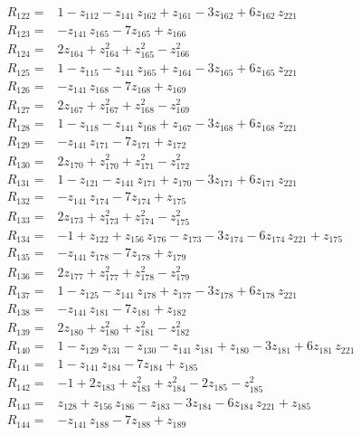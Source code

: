 \begin{align*}
R_{122}={}& 1 - z_{112} - z_{141}\,z_{162} + z_{161} - 3z_{162} + 6z_{162}\,z_{221} \\[2pt]
R_{123}={}& -z_{141}\,z_{165} - 7z_{165} + z_{166} \\[2pt]
R_{124}={}& 2z_{164} + z_{164}^{2} + z_{165}^{2} - z_{166}^{2} \\[2pt]
R_{125}={}& 1 - z_{115} - z_{141}\,z_{165} + z_{164} - 3z_{165} + 6z_{165}\,z_{221} \\[2pt]
R_{126}={}& -z_{141}\,z_{168} - 7z_{168} + z_{169} \\[2pt]
R_{127}={}& 2z_{167} + z_{167}^{2} + z_{168}^{2} - z_{169}^{2} \\[2pt]
R_{128}={}& 1 - z_{118} - z_{141}\,z_{168} + z_{167} - 3z_{168} + 6z_{168}\,z_{221} \\[2pt]
R_{129}={}& -z_{141}\,z_{171} - 7z_{171} + z_{172} \\[2pt]
R_{130}={}& 2z_{170} + z_{170}^{2} + z_{171}^{2} - z_{172}^{2} \\[2pt]
R_{131}={}& 1 - z_{121} - z_{141}\,z_{171} + z_{170} - 3z_{171} + 6z_{171}\,z_{221} \\[2pt]
R_{132}={}& -z_{141}\,z_{174} - 7z_{174} + z_{175} \\[2pt]
R_{133}={}& 2z_{173} + z_{173}^{2} + z_{174}^{2} - z_{175}^{2} \\[2pt]
R_{134}={}& -1 + z_{122} + z_{156}\,z_{176} - z_{173} - 3z_{174} - 6z_{174}\,z_{221} + z_{175} \\[2pt]
R_{135}={}& -z_{141}\,z_{178} - 7z_{178} + z_{179} \\[2pt]
R_{136}={}& 2z_{177} + z_{177}^{2} + z_{178}^{2} - z_{179}^{2} \\[2pt]
R_{137}={}& 1 - z_{125} - z_{141}\,z_{178} + z_{177} - 3z_{178} + 6z_{178}\,z_{221} \\[2pt]
R_{138}={}& -z_{141}\,z_{181} - 7z_{181} + z_{182} \\[2pt]
R_{139}={}& 2z_{180} + z_{180}^{2} + z_{181}^{2} - z_{182}^{2} \\[2pt]
R_{140}={}& 1 - z_{129}\,z_{131} - z_{130} - z_{141}\,z_{181} + z_{180} - 3z_{181} + 6z_{181}\,z_{221} \\[2pt]
R_{141}={}& 1 - z_{141}\,z_{184} - 7z_{184} + z_{185} \\[2pt]
R_{142}={}& -1 + 2z_{183} + z_{183}^{2} + z_{184}^{2} - 2z_{185} - z_{185}^{2} \\[2pt]
R_{143}={}& z_{128} + z_{156}\,z_{186} - z_{183} - 3z_{184} - 6z_{184}\,z_{221} + z_{185} \\[2pt]
R_{144}={}& -z_{141}\,z_{188} - 7z_{188} + z_{189} \\[2pt]

\end{align*}

